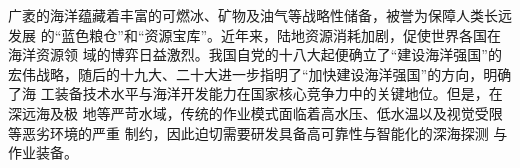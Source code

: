 



\label{Introduction:background}

广袤的海洋蕴藏着丰富的可燃冰、矿物及油气等战略性储备，被誉为保障人类长远发展
的“蓝色粮仓”和“资源宝库”。近年来，陆地资源消耗加剧，促使世界各国在海洋资源领
域的博弈日益激烈。我国自党的十八大起便确立了“建设海洋强国”的
宏伟战略，随后的十九大、二十大进一步指明了“加快建设海洋强国”的方向，明确了海
工装备技术水平与海洋开发能力在国家核心竞争力中的关键地位。但是，在深远海及极
地等严苛水域，传统的作业模式面临着高水压、低水温以及视觉受限等恶劣环境的严重
制约，因此迫切需要研发具备高可靠性与智能化的深海探测
与作业装备。

